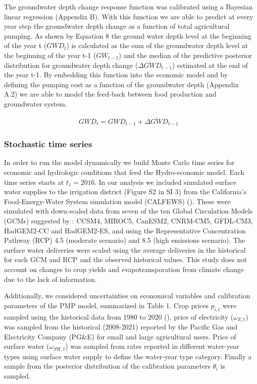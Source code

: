 \documentclass[11pt,a4paper]{article}
\begin{document}
The groundwater depth change response function was calibrated using a Bayesian linear regression (Appendix B). With this function we are able to predict at every year step the groundwater depth change as a function of total agricultural pumping. As shown by Equation 8 the ground water depth level at the beginning of the year t ($GWD_{t}$) is calculated as the sum of the groundwater depth level at the beginning of the year t-1 ($GW_{t-1}$) and the median of the predictive posterior distribution for groundwater depth change ($\overline{\Delta GWD}_{t-1}$) estimated at the end of the year t-1. By embedding this function into the economic model and by defining the pumping cost as a function of the groundwater depth (Appendix A.2) we are able to model the feed-back between food production and groundwater system.

\begin{align}
GWD_{t} = GWD_{t-1} + \overline{\Delta GWD}_{t-1}
\end{align}

\subsubsection{Stochastic time series}

In order to run the model dynamically we build Monte Carlo time series for economic and hydrologic conditions that feed the Hydro-economic model. Each time series starts at $t_{1}=2016$. In our analysis we included simulated surface water supplies to the irrigation district (Figure S2 in SI 3) from the California’s Food-Energy-Water System simulation model (CALFEWS) (\cite{zeff_californias_2021}). These were simulated with down-scaled data from seven of the ten Global Circulation Models (GCMs) suggested by \textcite{pierce_climate_2018}: CCSM4, MIROC5, CanESM2, CNRM-CM5, GFDL-CM3, HadGEM2-CC and HadGEM2-ES, and using the Representative Concentration Pathway (RCP) 4.5 (moderate scenario) and 8.5 (high emissions scenario). The surface water deliveries were scaled using the average deliveries in the historical for each GCM and RCP and the observed historical values. This study does not account on changes to crop yields and evapotransporation from climate change due to the lack of information. 

Additionally, we considered uncertainties on economical variables and calibration parameters of the PMP model, summarized in Table 1. Crop prices $p_{i,t}$ were sampled using the historical data from 1980 to 2020 (\cite{usda_national_2020}), price of electricity ($\omega_{E,t}$) was sampled from the historical (2008-2021) reported by the Pacific Gas and Electricity Company (PG\&E) for small and large agricultural users. Price of surface water ($\omega_{SW,t}$) was sampled from rates reported in different water-year types using surface water supply to define the water-year type category. Finally a sample from the posterior distribution of the calibration parameters $\theta_{i}$ is sampled.
\end{document}
